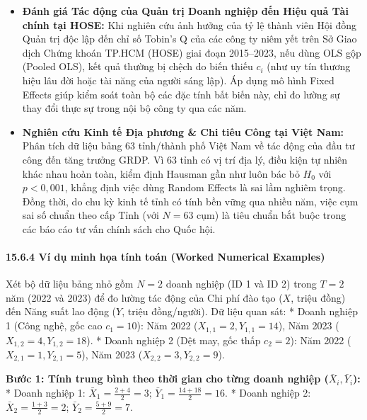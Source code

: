 \documentclass[
]{article}
\providecommand{\tightlist}{%
  \setlength{\itemsep}{0pt}\setlength{\parskip}{0pt}}
\begin{document}
\begin{itemize}
\tightlist
\item
  \textbf{Đánh giá Tác động của Quản trị Doanh nghiệp đến Hiệu quả Tài
  chính tại HOSE:} Khi nghiên cứu ảnh hưởng của tỷ lệ thành viên Hội
  đồng Quản trị độc lập đến chỉ số Tobin's Q của các công ty niêm yết
  trên Sở Giao dịch Chứng khoán TP.HCM (HOSE) giai đoạn 2015--2023, nếu
  dùng OLS gộp (Pooled OLS), kết quả thường bị chệch do biến thiếu
  \(c_i\) (như uy tín thương hiệu lâu đời hoặc tài năng của người sáng
  lập). Áp dụng mô hình Fixed Effects giúp kiểm soát toàn bộ các đặc
  tính bất biến này, chỉ đo lường sự thay đổi thực sự trong nội bộ công
  ty qua các năm.
\item
  \textbf{Nghiên cứu Kinh tế Địa phương \& Chi tiêu Công tại Việt Nam:}
  Phân tích dữ liệu bảng 63 tỉnh/thành phố Việt Nam về tác động của đầu
  tư công đến tăng trưởng GRDP. Vì 63 tỉnh có vị trí địa lý, điều kiện
  tự nhiên khác nhau hoàn toàn, kiểm định Hausman gần như luôn bác bỏ
  \(H_0\) với \(p < 0,001\), khẳng định việc dùng Random Effects là sai
  lầm nghiêm trọng. Đồng thời, do chu kỳ kinh tế tỉnh có tính bền vững
  qua nhiều năm, việc cụm sai số chuẩn theo cấp Tỉnh (với \(N=63\) cụm)
  là tiêu chuẩn bắt buộc trong các báo cáo tư vấn chính sách cho Quốc
  hội.
\end{itemize}

\paragraph{15.6.4 Ví dụ minh họa tính toán (Worked Numerical
Examples)}\label{vuxed-dux1ee5-minh-hux1ecda-tuxednh-touxe1n-worked-numerical-examples-45}

Xét bộ dữ liệu bảng nhỏ gồm \(N = 2\) doanh nghiệp (ID 1 và ID 2) trong
\(T = 2\) năm (2022 và 2023) để đo lường tác động của Chi phí đào tạo
(\(X\), triệu đồng) đến Năng suất lao động (\(Y\), triệu đồng/người). Dữ
liệu quan sát: * Doanh nghiệp 1 (Công nghệ, gốc cao \(c_1 = 10\)): Năm
2022 (\(X_{1,1}=2, Y_{1,1}=14\)), Năm 2023 (\(X_{1,2}=4, Y_{1,2}=18\)).
* Doanh nghiệp 2 (Dệt may, gốc thấp \(c_2 = 2\)): Năm 2022
(\(X_{2,1}=1, Y_{2,1}=5\)), Năm 2023 (\(X_{2,2}=3, Y_{2,2}=9\)).

\textbf{Bước 1: Tính trung bình theo thời gian cho từng doanh nghiệp
(\(\bar{X}_i, \bar{Y}_i\)):} * Doanh nghiệp 1:
\(\bar{X}_1 = \frac{2 + 4}{2} = 3\);
\(\bar{Y}_1 = \frac{14 + 18}{2} = 16\). * Doanh nghiệp 2:
\(\bar{X}_2 = \frac{1 + 3}{2} = 2\);
\(\bar{Y}_2 = \frac{5 + 9}{2} = 7\).
\end{document}
